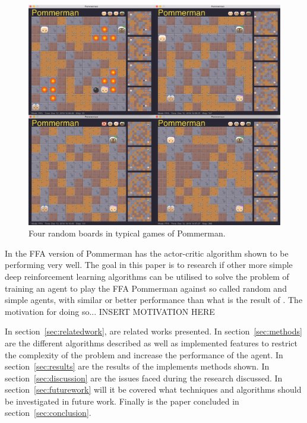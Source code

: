 \begin{figure}[htb]
    \centerline{\includegraphics[width=0.7\linewidth]{docs/article/inputs/4pommerview.jpg}}
    \caption{Four random boards in typical games of Pommerman.}
    \label{fig:pomIntro}
\end{figure}

In the FFA version of Pommerman has the actor-critic algorithm shown to be performing very well.\cite{rwightman} The goal in this paper is to research if other more simple deep reinforcement learning algorithms can be utilised to solve the problem of training an agent to play the FFA Pommerman against so called random and simple agents, with similar or better performance than what is the result of \cite{rwightman}. The motivation for doing so... INSERT MOTIVATION HERE


In section~\ref{sec:relatedwork}, are related works presented. In section~\ref{sec:methods} are the different algorithms described as well as implemented features to restrict the complexity of the problem and increase the performance of the agent. In section~\ref{sec:results} are the results of the implements methods shown. In section~\ref{sec:discussion} are the issues faced during the research discussed. In section~\ref{sec:futurework} will it be covered what techniques and algorithms should be investigated in future work. Finally is the paper concluded in section~\ref{sec:conclusion}.